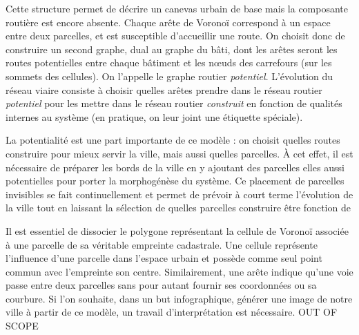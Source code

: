 \documentclass[10pt]{article}
\begin{document}
Cette structure permet de décrire un canevas urbain de base mais la
composante routière est encore absente. Chaque arête de Voronoï
correspond à un espace entre deux parcelles, et est susceptible
d'accueillir une route. On choisit donc de construire un second
graphe, dual au graphe du bâti, dont les arêtes seront les routes
potentielles entre chaque bâtiment et les n\oe uds des carrefours (sur
les sommets des cellules). On l'appelle le graphe routier
\textit{potentiel}. L'évolution du réseau viaire consiste à choisir
quelles arêtes prendre dans le réseau routier \textit{potentiel} pour
les mettre dans le réseau routier \textit{construit} en fonction de
qualités internes au système (en pratique, on leur joint une étiquette
spéciale).

La potentialité est une part importante de ce modèle : on choisit
quelles routes construire pour mieux servir la ville, mais aussi
quelles parcelles. À cet effet, il est nécessaire de préparer les
bords de la ville en y ajoutant des parcelles elles aussi potentielles
pour porter la morphogénèse du système. Ce placement de parcelles
invisibles se fait continuellement et permet de prévoir à court terme
l'évolution de la ville tout en laissant la sélection de quelles
parcelles construire être fonction de

Il est essentiel de dissocier le polygone représentant la cellule de
Voronoï associée à une parcelle de sa véritable empreinte
cadastrale. Une cellule représente l'influence d'une parcelle dans
l'espace urbain et possède comme seul point commun avec l'empreinte
son centre. Similairement, une arête indique qu'une voie passe entre
deux parcelles sans pour autant fournir ses coordonnées ou sa
courbure. Si l'on souhaite, dans un but infographique, générer une
image de notre ville à partir de ce modèle, un travail
d'interprétation est nécessaire. OUT OF SCOPE
\end{document}
